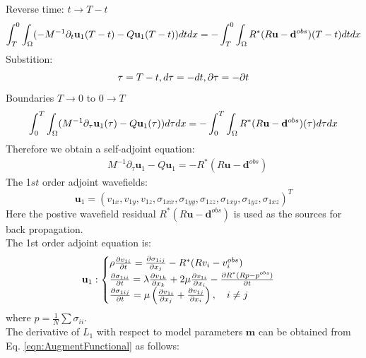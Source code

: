 \documentclass[pdftex,a4paper,parskip,listof=totoc,bibliography=totoc,onehalfspacing,12pt]{scrreprt}
\begin{document}
Reverse time: $t \to T-t$
\begin{equation}
 \int_T^0 \int_\Omega (-M^{-1} \partial_{t} \mathbf{u}_{1}(T-t) - Q \mathbf{u}_{1}(T-t) )  dt dx = -\int_T^0 \int_\Omega R^{*}(R\mathbf{u} - \mathbf{d}^{obs})(T-t) dt dx\\
\end{equation}
Substition: 
\begin{equation}
 \tau = T - t, d\tau = -dt, \partial \tau = -\partial t\\
\end{equation}
Boundaries $T \to 0$ to $0 \to T$
\begin{equation}
 \int_0^T \int_\Omega (M^{-1} \partial_{\tau} \mathbf{u}_{1}(\tau) - Q \mathbf{u}_{1}(\tau) )  d\tau dx = -\int_0^T \int_\Omega R^{*}(R\mathbf{u} - \mathbf{d}^{obs})(\tau) d\tau dx\\
\end{equation}
Therefore we obtain a self-adjoint equation:
\begin{equation}
\begin{aligned}
\label{eqn:AdjointEquation1}
& M^{-1} \partial_{\tau} \mathbf{u}_{1} - Q \mathbf{u}_{1} =  - R^{*}(R\mathbf{u} - \mathbf{d}^{obs})
\end{aligned}
\end{equation}
The 1$st$ order adjoint wavefields:
\begin{equation}
\mathbf{ u}_1=\left(v_{1x},v_{1y},v_{1z},\sigma_{1xx},\sigma_{1yy},\sigma_{1zz},\sigma_{1xy},\sigma_{1yz},\sigma_{1xz}\right)^T
\end{equation}
Here the postive wavefield residual $R^{*}(R\mathbf{u} - \mathbf{d}^{obs}) $ is used as the sources for back propagation. \\
The 1st order adjoint equation is:
\begin{equation}
\label{eqn:AdjointEquation11}
\mathbf{u}_{1}:
\begin{cases}
\rho\pdv{v_{1i}}{t}=\pdv{\sigma_{1ij}}{x_j}-R^{*}(R v_i -v_i^{obs})\\
\pdv{\sigma_{1ii}}{t} = \lambda \pdv{v_{1k}}{x_k} + 2\mu \pdv{v_{1i}}{x_i}-\pdv{R^{*}(R p - p^{obs})}{t}\\
\pdv{\sigma_{1ij}}{t} = \mu \left(\pdv{v_{1i}}{x_j} +\pdv{v_{1j}}{x_i}\right), \quad i \neq j
\end{cases}
\end{equation}
where $p=\frac{1}{N} \sum \sigma_{ii}$.\\
The derivative of $L_1$ with respect to model parameters $\mathbf{m}$ can be obtained from Eq. \ref{eqn:AugmentFunctional} as follows:
\end{document}
